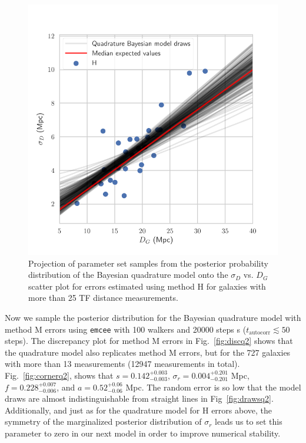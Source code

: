 \documentclass[a4paper,fleqn,usenatbib]{mnras}
\begin{document}
\begin{figure}
	\includegraphics[scale=0.7]{drawsq}
    \caption{Projection of parameter set samples from the posterior probability distribution of the Bayesian quadrature model onto the  $\sigma_D$ vs. $D_G$ scatter plot for errors estimated using method H for galaxies with more than 25 TF distance measurements.}
    \label{fig:drawsq}
\end{figure}
Now we sample the posterior distribution for the Bayesian quadrature model with method M errors using \texttt{emcee} with 100 walkers and 20000 steps s ($t_\mathrm{autocorr} \lesssim 50$ steps). The discrepancy plot for method M errors in Fig.~\ref{fig:discq2} shows that the quadrature model also replicates method M errors, but for the 727 galaxies with more than 13 measurements (12947 measurements in total). Fig.~\ref{fig:cornerq2}, shows that $s=0.142_{-0.003}^{+0.003}$, $\sigma_r=0.004_{-0.201}^{+0.201}$ Mpc, $f=0.228_{-0.006}^{+0.007}$, and $a=0.52_{-0.06}^{+0.06}$ Mpc. The random error is so low that the model draws are almost indistinguishable from straight lines in Fig~\ref{fig:drawsq2}. Additionally, and just as for the quadrature model for H errors above, the symmetry of the marginalized posterior distribution of $\sigma_r$ leads us to set this parameter to zero in our next model in order to improve numerical stability.
\end{document}
